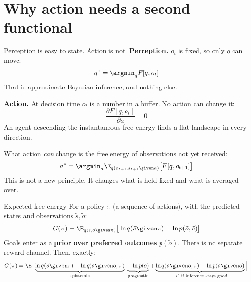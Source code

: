 
\section{Why action needs a second functional}

\begin{frame}{Perception is easy to state. Action is not.}
  \textbf{Perception.} $o_t$ is fixed, so only $q$ can move:
  \[ q^\ast = \argmin_q F[q,o_t] \]
  That is approximate Bayesian inference, and nothing else.

  \pause
  \vspace{0.6em}
  \textbf{Action.} At decision time $o_t$ is a number in a buffer. No action can change it:
  \[ \frac{\partial F[q,o_t]}{\partial a} = 0 \]
  An agent descending the instantaneous free energy finds a \alert{flat landscape} in every
  direction.

  \pause
  \vspace{0.6em}
  What action \emph{can} change is the free energy of observations not yet received:
  \[ a^\ast = \argmin_a \E_{q(o_{t+1},s_{t+1}\given a)}\big[F[q,o_{t+1}]\big] \]
  This is not a new principle. It changes what is held fixed and what is averaged over.
\end{frame}

\begin{frame}{Expected free energy}
  For a policy $\pi$ (a sequence of actions), with the predicted states and observations
  $\tilde s,\tilde o$:
  \[ G(\pi) = \E_{q(\tilde s,\tilde o\given\pi)}\big[\ln q(\tilde s\given\pi) - \ln p(\tilde o,\tilde s)\big] \]
  Goals enter as a \textbf{prior over preferred outcomes} $p(\tilde o)$. There is no separate
  reward channel. Then, exactly:
  \[
    G(\pi) = \E\Big[
      \underbrace{\ln q(\tilde s\given\pi) - \ln q(\tilde s\given\tilde o,\pi)}_{\text{epistemic}}
      \;\underbrace{-\ln p(\tilde o)}_{\text{pragmatic}}
      + \underbrace{\ln q(\tilde s\given\tilde o,\pi)-\ln p(\tilde s\given\tilde o)}_{\to 0 \text{ if inference stays good}}
    \Big]
  \]
\end{frame}

